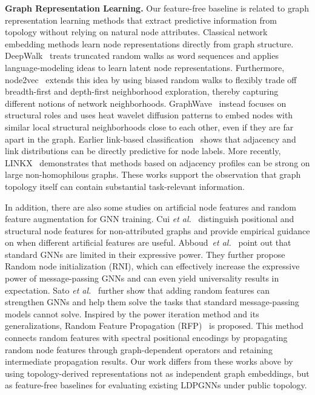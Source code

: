 \documentclass[conference,compsoc]{IEEEtran}
\newcommand{\etal}{\textit{et al.}\xspace}
\theoremstyle{boldplain}
\theoremstyle{bolddefinition}
\theoremstyle{remark}
\newcommand{\mypara}[1]{\noindent\textbf{#1.}\xspace}
\newcommand{\ldpgnns}{LDPGNNs\xspace}
\begin{document}
\vspace{0.1cm}

\mypara{Graph Representation Learning}
Our feature-free baseline is related to graph representation learning methods that extract predictive information from topology without relying on natural node attributes. 
Classical network embedding methods learn node representations directly from graph structure. 
DeepWalk~\cite{perozzi2014deepwalk} treats truncated random walks as word sequences and applies language-modeling ideas to learn latent node representations. 
Furthermore, node2vec~\cite{grover2016node2vec} extends this idea by using biased random walks to flexibly trade off breadth-first and depth-first neighborhood exploration, thereby capturing different notions of network neighborhoods. 
GraphWave~\cite{donnat2018graphwave} instead focuses on structural roles and uses heat wavelet diffusion patterns to embed nodes with similar local structural neighborhoods close to each other, even if they are far apart in the graph. 
Earlier link-based classification~\cite{lu2003linkbased} shows that adjacency and link distributions can be directly predictive for node labels. 
More recently, LINKX~\cite{lim2021large} demonstrates that methods based on adjacency profiles can be strong on large non-homophilous graphs. 
These works support the observation that graph topology itself can contain substantial task-relevant information.

In addition, there are also some studies on
artificial node features and random feature augmentation for GNN training. 
Cui \etal~\cite{cui2022positional} distinguish positional and structural node features for non-attributed graphs and provide empirical guidance on when different artificial features are useful. 
Abboud~\etal~\cite{abboud2021rni} point out that standard GNNs are limited in their expressive power.
They further propose 
Random node initialization (RNI), which can effectively increase the expressive power of message-passing GNNs and can even yield universality results in expectation. 
Sato \etal~\cite{sato2021randomfeatures} further show that adding random features can strengthen GNNs and help them solve the tasks that standard message-passing models cannot solve. 
Inspired by the power iteration method and its generalizations,
Random Feature Propagation (RFP)~\cite{eliasof2023rfp} is proposed. 
This method connects random features with spectral positional encodings by propagating random node features through graph-dependent operators and retaining intermediate propagation results. 
Our work differs from these works above by using topology-derived representations not as independent graph embeddings, but as feature-free baselines for evaluating existing \ldpgnns under public topology.
\end{document}
